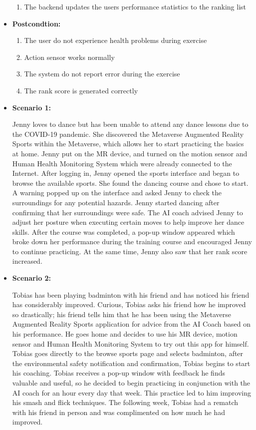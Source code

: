 \documentclass[a4paper]{article}
\begin{document}
\begin{itemize}
\begin{enumerate}[itemindent=1em]
			\item The backend updates the users performance statistics to the ranking list	
		\end{enumerate}
		\item[] \textbf{Postcondtion:}
		\begin{enumerate}[itemindent=1em]
			\item The user do not experience health problems during exercise
			\item Action sensor works normally
			\item The system do not report error during the exercise
			\item The rank score is generated correctly	
		\end{enumerate}
		\item[] \textbf{Scenario 1:}
		\par \hspace*{1cm} Jenny loves to dance but has been unable to attend any dance lessons due to the  COVID-19 pandemic. She discovered the Metaverse Augmented Reality Sports within the Metaverse, which allows her to start practicing the basics at home. Jenny put on the MR device, and turned on the motion sensor and Human Health Monitoring System which were already connected to the Internet. After logging in, Jenny opened the sports interface and began to browse the available sports. She found the dancing course and chose to start. A warning popped up on the interface and asked Jenny to check the surroundings for any potential hazards. Jenny started dancing after confirming that her surroundings were safe. The AI coach advised Jenny to adjust her posture when executing certain moves to help improve her dance skills. After the course was completed, a pop-up window appeared which broke down her performance during the training course and encouraged Jenny to continue practicing. At the same time, Jenny also saw that her rank score increased.
		\item[] \textbf{Scenario 2:}
		\par \hspace*{1cm} Tobias has been playing badminton with his friend and has noticed his friend has considerably improved. Curious, Tobias asks his friend how he improved so drastically; his friend tells him that he has been using the Metaverse Augmented Reality Sports application for advice from the AI Coach based on his performance. He goes home and decides to use his MR device, motion sensor and Human Health Monitoring System to try out this app for himself. Tobias goes directly to the browse sports page and selects badminton, after the environmental safety notification and confirmation, Tobias begins to start his coaching. Tobias receives a pop-up window with feedback he finds valuable and useful, so he decided to begin practicing in conjunction with the AI coach for an hour every day that week. This practice led to him improving his smash and flick techniques. The following week, Tobias had a rematch with his friend in person and was complimented on how much he had improved.
	\end{itemize}
\end{document}
